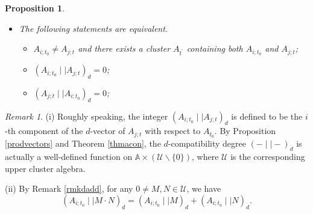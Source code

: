 \documentclass{amsart}
\newtheorem{proposition}[theorem]{Proposition}
\theoremstyle{definition}
\theoremstyle{remark}
\newtheorem{remark}[theorem]{Remark}
\numberwithin{equation}{section}
\begin{document}
\begin{proposition}
\begin{itemize}
\begin{itemize}
\item[(iii)]$(A_{j;t}\mid\mid  A_{i;t_0})_d<0$;
\item[(iv)] $(A_{i;t_0}\mid\mid  A_{j;t})_d=-1$;

\item[(v)] $(A_{j;t}\mid\mid  A_{i;t_0})_d=-1$.
\end{itemize}

\item[(5)] The following statements are equivalent.
\begin{itemize}
\item[(i)] $A_{i;t_0}\neq A_{j;t}$ and there exists a cluster $A_{t^\prime}$ containing both $A_{i;t_0}$ and $A_{j;t}$;

\item[(ii)] $(A_{i;t_0}\mid\mid  A_{j;t})_d=0$;
\item[(iii)] $(A_{j;t}\mid\mid  A_{i;t_0})_d=0$;
\end{itemize}
\end{itemize}
\end{proposition}

\begin{remark}\label{rmkdadd2}
(i) Roughly speaking, the integer $(A_{i;t_0}\mid\mid  A_{j;t})_d$ is defined to be the $i$-th component of the $d$-vector of $A_{j;t}$ with respect to $A_{t_0}$. By Proposition \ref{prodvectors} and Theorem \ref{thmacon}, the $d$-compatibility degree $(-\mid\mid  -)_d$ is actually a well-defined function on $\mathbb A\times (\mathcal U\backslash\{0\})$, where $\mathcal U$ is the corresponding upper cluster algebra.

(ii) By Remark \ref{rmkdadd}, for any $0\neq M,N\in\mathcal U$, we have $$(A_{i;t_0}\mid\mid  M\cdot N)_d=(A_{i;t_0}\mid\mid  M)_d+(A_{i;t_0}\mid\mid  N)_d.$$
\end{remark}
\end{document}
